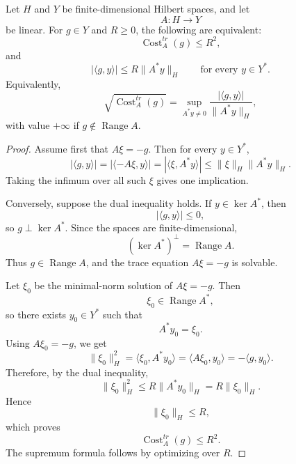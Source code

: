 \documentclass[10pt,a4paper]{amsart}
\begin{document}
\begin{lemma}
\label{lem:trace-cost-duality-clean}
Let \(H\) and \(Y\) be finite-dimensional Hilbert spaces, and let
\[
        A:H\to Y
\]
be linear.  For \(g\in Y\) and \(R\ge0\), the following are equivalent:
\[
        \operatorname{Cost}^{tr}_A(g)\le R^2,
\]
and
\[
        |\langle g,y\rangle|
        \le
        R\|A^*y\|_H
        \qquad
        \text{for every }y\in Y^*.
\]
Equivalently,
\[
        \sqrt{\operatorname{Cost}^{tr}_A(g)}
        =
        \sup_{A^*y\ne0}
        \frac{|\langle g,y\rangle|}
             {\|A^*y\|_H},
\]
with value \(+\infty\) if \(g\notin \operatorname{Range}A\).
\end{lemma}

\begin{proof}
Assume first that \(A\xi=-g\).  Then for every \(y\in Y^*\),
\[
        |\langle g,y\rangle|
        =
        |\langle -A\xi,y\rangle|
        =
        |\langle \xi,A^*y\rangle|
        \le
        \|\xi\|_H\|A^*y\|_H.
\]
Taking the infimum over all such \(\xi\) gives one implication.

Conversely, suppose the dual inequality holds.  If \(y\in\ker A^*\), then
\[
        |\langle g,y\rangle|\le0,
\]
so \(g\perp \ker A^*\).  Since the spaces are finite-dimensional,
\[
        (\ker A^*)^\perp=\operatorname{Range}A.
\]
Thus \(g\in\operatorname{Range}A\), and the trace equation \(A\xi=-g\) is
solvable.

Let \(\xi_0\) be the minimal-norm solution of \(A\xi=-g\).  Then
\[
        \xi_0\in \operatorname{Range}A^*,
\]
so there exists \(y_0\in Y^*\) such that
\[
        A^*y_0=\xi_0.
\]
Using \(A\xi_0=-g\), we get
\[
        \|\xi_0\|_H^2
        =
        \langle \xi_0,A^*y_0\rangle
        =
        \langle A\xi_0,y_0\rangle
        =
        -\langle g,y_0\rangle.
\]
Therefore, by the dual inequality,
\[
        \|\xi_0\|_H^2
        \le
        R\|A^*y_0\|_H
        =
        R\|\xi_0\|_H.
\]
Hence
\[
        \|\xi_0\|_H\le R,
\]
which proves
\[
        \operatorname{Cost}^{tr}_A(g)\le R^2.
\]
The supremum formula follows by optimizing over \(R\).
\end{proof}
\end{document}
